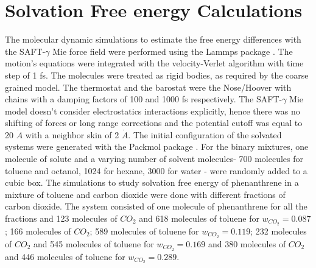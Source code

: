 %
\section{Solvation Free energy Calculations}

The molecular dynamic simulations to estimate the free energy differences with the SAFT-$\gamma$ Mie force field were performed using the Lammps package \cite{lammps}. The motion's equations were integrated with the velocity-Verlet algorithm \cite{verlet} with time step of 1 fs. The molecules were treated as rigid bodies, as required by the coarse grained model. The thermostat and the barostat were the Nose/Hoover with chains with a damping factors of 100 and 1000 fs respectively. The SAFT-$\gamma$ Mie model doesn't consider electrostatics interactions explicitly, hence there was no shifting of forces or long range corrections and the potential cutoff was equal to 20 $\dot{A}$ with a neighbor skin of 2 $\dot{A}$. The initial configuration of the  solvated systems were generated with the Packmol package \cite{packmol}. For the binary mixtures, one molecule of solute and a varying number of solvent molecules- 700 molecules for toluene and octanol, 1024 for hexane, 3000 for water - were randomly added to a cubic box. The simulations to study solvation free energy of phenanthrene in a mixture of toluene and carbon dioxide were done with different fractions of carbon dioxide. The  system consisted of one molecule of phenanthrene for all the fractions and 123 molecules of $CO_{2}$ and 618 molecules of toluene for $w_{CO_{2}} = 0.087$; 166 molecules of $CO_{2}$; 589 molecules of toluene for $w_{CO_{2}} = 0.119$; 232 molecules of $CO_{2}$ and 545 molecules of toluene for $w_{CO_{2}} = 0.169$ and 380 molecules of $CO_{2}$ and 446 molecules of toluene for $w_{CO_{2}} = 0.289$.

